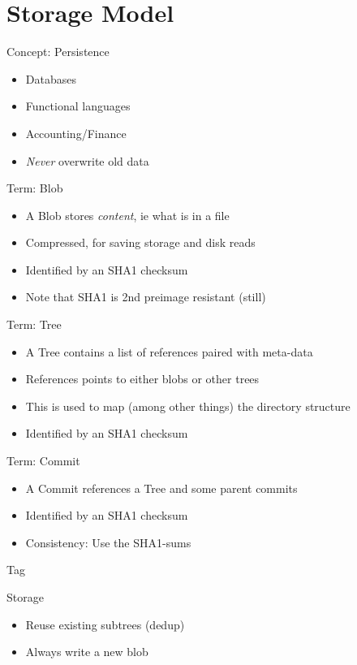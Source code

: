 \documentclass[xcolor=pdftex,dvipsnames]{beamer}
\begin{document}
\section{Storage Model}
\begin{frame}{Concept: Persistence}
  \begin{itemize}
  \item Databases
  \item Functional languages
  \item Accounting/Finance
  \item \emph{Never} overwrite old data
  \end{itemize}
\end{frame}
\begin{frame}{Term: Blob}
  \begin{itemize}
  \item A Blob stores \emph{content}, ie what is in a file
  \item Compressed, for saving storage and disk reads
  \item Identified by an SHA1 checksum
  \item Note that SHA1 is 2nd preimage resistant (still)
  \end{itemize}
\end{frame}
\begin{frame}{Term: Tree}
  \begin{itemize}
  \item A Tree contains a list of references paired with meta-data
  \item References points to either blobs or other trees
  \item This is used to map (among other things) the directory
    structure
  \item Identified by an SHA1 checksum
  \end{itemize}
\end{frame}
\begin{frame}{Term: Commit}
  \begin{itemize}
  \item A Commit references a Tree and some parent commits
  \item Identified by an SHA1 checksum
  \item Consistency: Use the SHA1-sums
  \end{itemize}
\end{frame}
\begin{frame}{Tag}\end{frame}
\begin{frame}{Storage}
  \begin{itemize}
  \item Reuse existing subtrees (dedup)
  \item Always write a new blob
  \end{itemize}
\end{frame}
\end{document}
